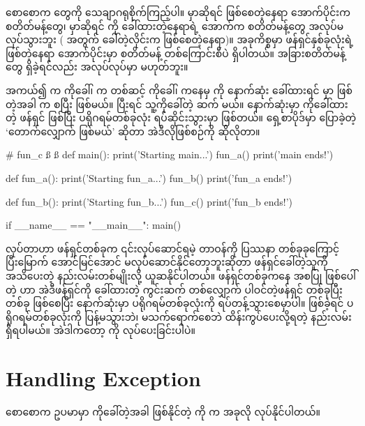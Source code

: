 စောစောက တွေကို သေချာဂရုစိုက်ကြည့်ပါ။  မှာဆိုရင်  ဖြစ်စေတဲ့နေရာ အောက်ပိုင်းက စတိတ်မန့်တွေ၊  မှာဆိုရင်  ကို ခေါ်ထားတဲ့နေရာရဲ့ အောက်က စတိတ်မန့်တွေ အလုပ်မလုပ်သွားဘူး ( အတွက်  ခေါ်တဲ့လိုင်းက  ဖြစ်စေတဲ့နေရာ)။  အခုကိစ္စမှာ ဖန်ရှင်နှစ်ခုလုံးရဲ့  ဖြစ်တဲ့နေရာ အောက်ပိုင်းမှာ  စတိတ်မန့် တစ်ကြောင်းစီပဲ ရှိပါတယ်။ အခြားစတိတ်မန့်တွေ ရှိခဲ့ရင်လည်း အလုပ်လုပ်မှာ မဟုတ်ဘူး။

အကယ်၍  က  ကိုခေါ်၊  က တစ်ဆင့်  ကိုခေါ်၊  ကနေမှ  ကို နောက်ဆုံး ခေါ်ထားရင်  မှာ  ဖြစ်တဲ့အခါ  က စပြီး  ဖြစ်မယ်။ ပြီးရင် သူ့ကိုခေါ်တဲ့  ဆက်  မယ်။ နောက်ဆုံးမှာ  ကိုခေါ်ထားတဲ့  ဖန်ရှင်  ဖြစ်ပြီး ပရိုဂရမ်တစ်ခုလုံး ရပ်ဆိုင်းသွားမှာ ဖြစ်တယ်။ ရှေ့စာပိုဒ်မှာ ပြောခဲ့တဲ့ ‘တောက်လျှောက်  ဖြစ်မယ်’ ဆိုတာ အဲဒီလိုဖြစ်စဉ်ကို ဆိုလိုတာ။

%
\begin{py}
# fun_c ß   ß  
def main():
    print('Starting main...')
    fun_a()
    print('main ends!')

def fun_a():
    print('Starting fun_a...')
    fun_b()
    print('fun_a ends!')

def fun_b():
    print('Starting fun_b...')
    fun_c()
    print('fun_b ends!')

if __name__ == "__main__":
    main()
\end{py}
%

 လုပ်တာဟာ ဖန်ရှင်တစ်ခုက ၎င်းလုပ်ဆောင်ရမဲ့ တာဝန်ကို ပြဿနာ တစ်ခုခုကြောင့် ပြီးမြောက် အောင်မြင်အောင် မလုပ်ဆောင်နိုင်တော့ဘူးဆိုတာ ဖန်ရှင်ခေါ်တဲ့သူကို အသိပေးတဲ့ နည်းလမ်းတစ်မျိုးလို့ ယူဆနိုင်ပါတယ်။ ဖန်ရှင်တစ်ခုကနေ အစပြု ဖြစ်ပေါ်တဲ့  ဟာ အဲဒီဖန်ရှင်ကို ခေါ်ထားတဲ့ ကွင်းဆက်  တစ်လျှောက် ပါဝင်တဲ့ဖန်ရှင် တစ်ခုပြီးတစ်ခု  ဖြစ်စေပြီး နောက်ဆုံးမှာ ပရိုဂရမ်တစ်ခုလုံးကို ရပ်တန့်သွားစေမှာပါ။  ဖြစ်ခဲ့ရင်  ပရိုဂရမ်တစ်ခုလုံးကို ပြန့်မသွားဘဲ၊ မသက်ရောက်စေဘဲ ထိန်းကွပ်ပေးလို့ရတဲ့ နည်းလမ်းရှိရပါမယ်။ အဲဒါကတော့  ကို  လုပ်ပေးခြင်းပါပဲ။ 



 

\section{Handling Exception}
စောစောက ဥပမာမှာ  ကိုခေါ်တဲ့အခါ ဖြစ်နိုင်တဲ့  ကို  က အခုလို  လုပ်နိုင်ပါတယ်။ 

